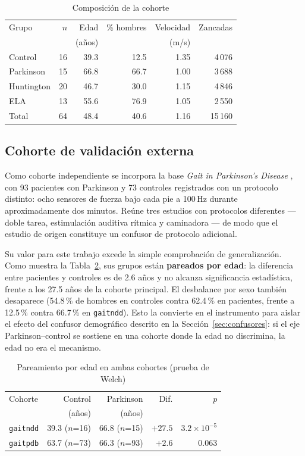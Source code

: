 \documentclass[conference]{IEEEtran}
\begin{document}
\begin{table}[t]
\caption{Composición de la cohorte}
\label{tab:cohorte}
\centering
\begin{tabular}{lrrrrr}
\toprule
Grupo & $n$ & Edad & \% hombres & Velocidad & Zancadas \\
 & & (años) & & (m/s) & \\
\midrule
Control    & 16 & 39.3 & 12.5 & 1.35 & 4\,076 \\
Parkinson  & 15 & 66.8 & 66.7 & 1.00 & 3\,688 \\
Huntington & 20 & 46.7 & 30.0 & 1.15 & 4\,846 \\
ELA        & 13 & 55.6 & 76.9 & 1.05 & 2\,550 \\
\midrule
Total      & 64 & 48.4 & 40.6 & 1.16 & 15\,160 \\
\bottomrule
\end{tabular}
\end{table}

\subsection{Cohorte de validación externa}

Como cohorte independiente se incorpora la base \textit{Gait in Parkinson's Disease} \cite{frenkel2005}, con 93 pacientes con Parkinson y 73 controles registrados con un protocolo distinto: ocho sensores de fuerza bajo cada pie a 100\,Hz durante aproximadamente dos minutos. Reúne tres estudios con protocolos diferentes --- doble tarea, estimulación auditiva rítmica y caminadora --- de modo que el estudio de origen constituye un confusor de protocolo adicional.

Su valor para este trabajo excede la simple comprobación de generalización. Como muestra la Tabla~\ref{tab:pareamiento}, sus grupos están \textbf{pareados por edad}: la diferencia entre pacientes y controles es de 2.6 años y no alcanza significancia estadística, frente a los 27.5 años de la cohorte principal. El desbalance por sexo también desaparece (54.8\,\% de hombres en controles contra 62.4\,\% en pacientes, frente a 12.5\,\% contra 66.7\,\% en \texttt{gaitndd}). Esto la convierte en el instrumento para aislar el efecto del confusor demográfico descrito en la Sección~\ref{sec:confusores}: si el eje Parkinson--control se sostiene en una cohorte donde la edad no discrimina, la edad no era el mecanismo.

\begin{table}[t]
\caption{Pareamiento por edad en ambas cohortes (prueba de Welch)}
\label{tab:pareamiento}
\centering
\begin{tabular}{lrrrr}
\toprule
Cohorte & Control & Parkinson & Dif. & $p$ \\
 & (años) & (años) & & \\
\midrule
\texttt{gaitndd} & 39.3 ($n$=16) & 66.8 ($n$=15) & $+27.5$ & $3.2\times10^{-5}$ \\
\texttt{gaitpdb} & 63.7 ($n$=73) & 66.3 ($n$=93) & $+2.6$ & $0.063$ \\
\bottomrule
\end{tabular}
\end{table}
\end{document}

